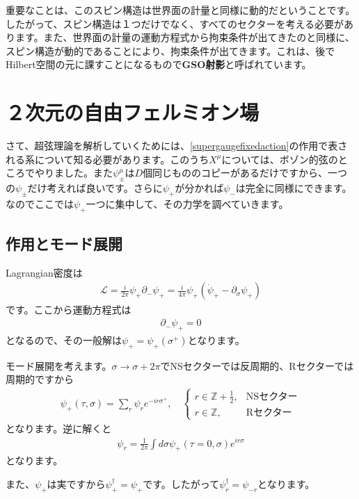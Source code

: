\documentclass[report,paper=a4, fontsize=12pt, line_length=16cm, number_of_lines=33,dvipdfmx]{jlreq}
\numberwithin{equation}{chapter}
\numberwithin{equation}{section}
\newcommand{\Zb}{\mathbb{Z}}
\newcommand{\del}{\partial}
\newcommand{\kyou}[1]{{\sffamily \bfseries #1}}
\newcommand{\Lcal}{\mathcal{L}}
\begin{document}
重要なことは、このスピン構造は世界面の計量と同様に動的だということです。したがって、スピン構造は１つだけでなく、すべてのセクターを考える必要があります。また、世界面の計量の運動方程式から拘束条件が出てきたのと同様に、スピン構造が動的であることにより、拘束条件が出てきます。これは、後でHilbert空間の元に課すことになるもので\kyou{GSO射影}と呼ばれています。

\section{２次元の自由フェルミオン場}
さて、超弦理論を解析していくためには、\eqref{supergaugefixedaction}の作用で表される系について知る必要があります。このうち$X^{\mu}$については、ボゾン的弦のところでやりました。また$\psi^{\mu}_{\pm}$は$D$個同じもののコピーがあるだけですから、一つの$\psi_{\pm}$だけ考えれば良いです。さらに$\psi_{+}$が分かれば$\psi_{-}$は完全に同様にできます。なのでここでは$\psi_{+}$一つに集中して、その力学を調べていきます。

\subsection{作用とモード展開}
Lagrangian密度は
\begin{align}
  \Lcal=\frac{i}{2\pi}\psi_{+}\del_{-}\psi_{+}=\frac{i}{4\pi}\psi_{+}(\dot{\psi}_{+}-\del_{\sigma}\psi_{+})\label{MWfermionaction}
\end{align}
です。ここから運動方程式は
\begin{align}
  \del_{-}\psi_{+}=0
\end{align}
となるので、その一般解は$\psi_{+}=\psi_{+}(\sigma^{+})$となります。

モード展開を考えます。$\sigma\to\sigma+2\pi$でNSセクターでは反周期的、Rセクターでは周期的ですから
\begin{align}
  \psi_{+}(\tau,\sigma)=\sum_{r} \psi_{r} e^{-ir\sigma^{+}},\quad
  \begin{cases}
    r\in \Zb+\frac12,&\text{NSセクター}\\
    r\in \Zb,&\text{Rセクター}
  \end{cases}
  \label{psimodeexp}
\end{align}
となります。逆に解くと
\begin{align}
  \psi_{r}=\frac{1}{2\pi}\int d\sigma \psi_{+}(\tau=0,\sigma)e^{ir\sigma}
\end{align}
となります。

また、$\psi_{+}$は実ですから$\psi_{+}^{\dag}=\psi_{+}$です。したがって$\psi_{r}^{\dag}=\psi_{-r}$となります。
\end{document}
